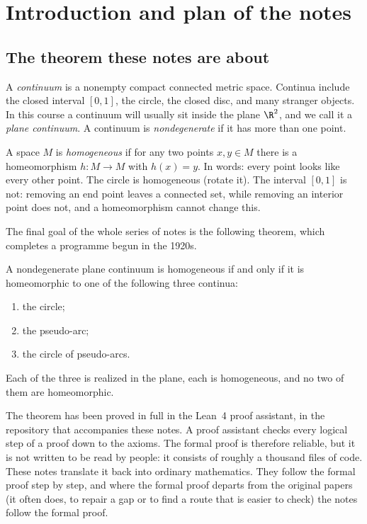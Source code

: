 \chapter{Introduction and plan of the notes}\label{ch:intro}

\section{The theorem these notes are about}

A \emph{continuum} is a nonempty compact connected metric space. Continua include the
closed interval $[0,1]$, the circle, the closed disc, and many stranger objects. In this
course a continuum will usually sit inside the plane $\R^2$, and we call it a \emph{plane
continuum}. A continuum is \emph{nondegenerate} if it has more than one point.

A space $M$ is \emph{homogeneous} if for any two points $x,y\in M$ there is a
homeomorphism $h\colon M\to M$ with $h(x)=y$. In words: every point looks like every
other point. The circle is homogeneous (rotate it). The interval $[0,1]$ is not: removing
an end point leaves a connected set, while removing an interior point does not, and a
homeomorphism cannot change this.

The final goal of the whole series of notes is the following theorem, which completes a
programme begun in the 1920s.

\begin{theorem}\label{thm:classification}
A nondegenerate plane continuum is homogeneous if and only if it is homeomorphic to one
of the following three continua:
\begin{enumerate}[label=(\roman*)]
\item the circle;
\item the pseudo-arc;
\item the circle of pseudo-arcs.
\end{enumerate}
Each of the three is realized in the plane, each is homogeneous, and no two of them are
homeomorphic.
\end{theorem}

The theorem has been proved in full in the Lean~4 proof assistant, in the repository
that accompanies these notes. A proof assistant checks every logical step of a proof
down to the axioms. The formal proof is therefore reliable, but it is not written to be
read by people: it consists of roughly a thousand files of code. These notes translate
it back into ordinary mathematics. They follow the formal proof step by step, and where
the formal proof departs from the original papers (it often does, to repair a gap or to
find a route that is easier to check) the notes follow the formal proof.

